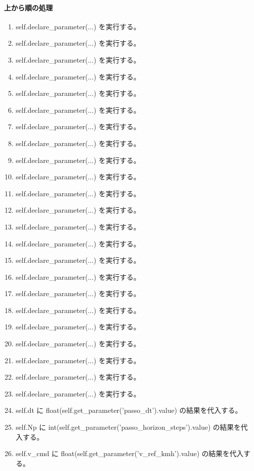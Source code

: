 \documentclass[a4paper,11pt]{article}
\begin{document}
            \paragraph{上から順の処理}
            \begin{enumerate}[leftmargin=1.8em]
            \item self.declare\_parameter(...) を実行する。
\item self.declare\_parameter(...) を実行する。
\item self.declare\_parameter(...) を実行する。
\item self.declare\_parameter(...) を実行する。
\item self.declare\_parameter(...) を実行する。
\item self.declare\_parameter(...) を実行する。
\item self.declare\_parameter(...) を実行する。
\item self.declare\_parameter(...) を実行する。
\item self.declare\_parameter(...) を実行する。
\item self.declare\_parameter(...) を実行する。
\item self.declare\_parameter(...) を実行する。
\item self.declare\_parameter(...) を実行する。
\item self.declare\_parameter(...) を実行する。
\item self.declare\_parameter(...) を実行する。
\item self.declare\_parameter(...) を実行する。
\item self.declare\_parameter(...) を実行する。
\item self.declare\_parameter(...) を実行する。
\item self.declare\_parameter(...) を実行する。
\item self.declare\_parameter(...) を実行する。
\item self.declare\_parameter(...) を実行する。
\item self.declare\_parameter(...) を実行する。
\item self.declare\_parameter(...) を実行する。
\item self.declare\_parameter(...) を実行する。
\item self.dt に float(self.get\_parameter('passo\_dt').value) の結果を代入する。
\item self.Np に int(self.get\_parameter('passo\_horizon\_steps').value) の結果を代入する。
\item self.v\_cmd に float(self.get\_parameter('v\_ref\_kmh').value) の結果を代入する。

\end{enumerate}
\end{document}
